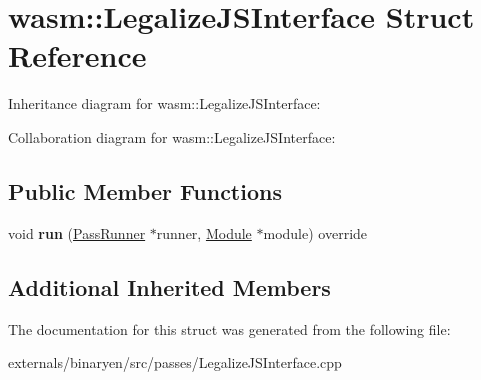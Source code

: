 \hypertarget{structwasm_1_1_legalize_j_s_interface}{}\section{wasm\+:\+:Legalize\+J\+S\+Interface Struct Reference}
\label{structwasm_1_1_legalize_j_s_interface}


Inheritance diagram for wasm\+:\+:Legalize\+J\+S\+Interface\+:


Collaboration diagram for wasm\+:\+:Legalize\+J\+S\+Interface\+:
\subsection*{Public Member Functions}
\begin{DoxyCompactItemize}
\item 
\mbox{\label{structwasm_1_1_legalize_j_s_interface_a65000f1ea503772d6d027f54bd6e0b20}} 
void {\bfseries run} (\mbox{\hyperlink{structwasm_1_1_pass_runner}{Pass\+Runner}} $\ast$runner, \mbox{\hyperlink{classwasm_1_1_module}{Module}} $\ast$module) override
\end{DoxyCompactItemize}
\subsection*{Additional Inherited Members}


The documentation for this struct was generated from the following file\+:\begin{DoxyCompactItemize}
\item 
externals/binaryen/src/passes/Legalize\+J\+S\+Interface.\+cpp\end{DoxyCompactItemize}
